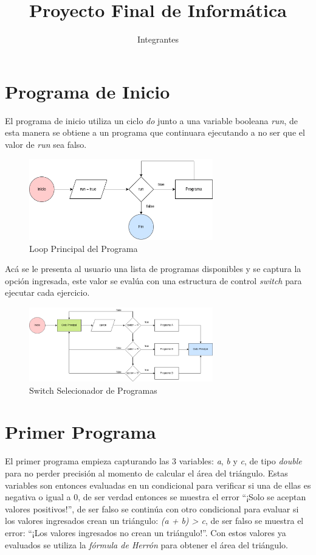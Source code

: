 \documentclass{article}
\title{Proyecto Final de Informática}
\author{Integrantes}
\begin{document}
    \maketitle
    
\section{Programa de Inicio}

El programa de inicio utiliza un ciclo \emph{do} junto a una variable booleana \emph{run}, de esta manera se obtiene a un programa que continuara ejecutando a no ser que el valor de \emph{run} sea falso. 

\begin{figure}[h]
    \centering
        \centering
    \includegraphics[width=8cm]{loop_inicio}
    \centering
        \centering
        \caption{Loop Principal del Programa}
\end{figure}

Acá se le presenta al usuario una lista de programas disponibles y se captura la opción ingresada, este valor se evalúa con una estructura de control \emph{switch} para ejecutar cada ejercicio.

\begin{figure}[h]
    \centering
    \includegraphics[width=8cm]{switch_programa}
    \caption{Switch Selecionador de Programas}
\end{figure}

\section{Primer Programa}

El primer programa empieza capturando las 3 variables: \emph{a}, \emph{b} y \emph{c}, de tipo \emph{double} para no perder precisión al momento de calcular el área del triángulo. Estas variables son entonces evaluadas en un condicional para verificar si una de ellas es negativa o igual a 0, de ser verdad entonces se muestra el error ``¡Solo se aceptan valores positivos!'', de ser falso se continúa con otro condicional para evaluar si los valores ingresados crean un triángulo: \emph{(a + b) > c}, de ser falso se muestra el error: ``¡Los valores ingresados no crean un triángulo!''. Con estos valores ya evaluados se utiliza la \emph{fórmula de Herrón} para obtener el área del triángulo.
\end{document}
